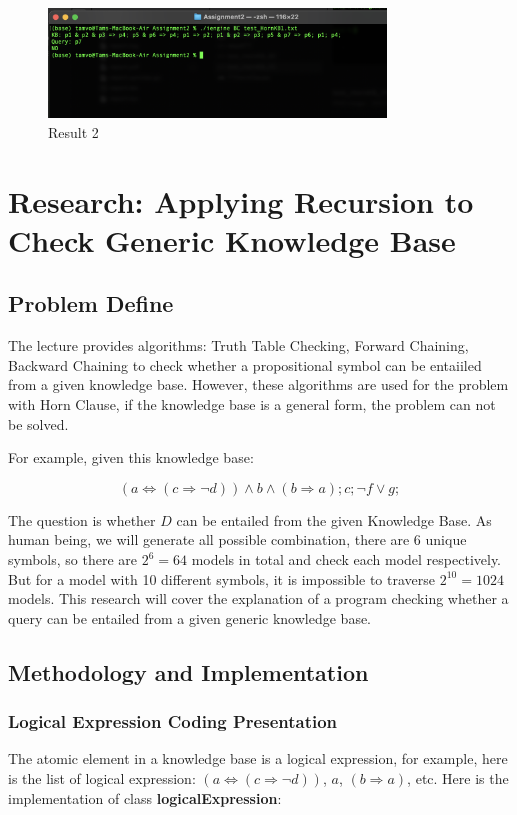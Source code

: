 \documentclass{assignment}
\begin{document}
\begin{figure}[h]
    \centering
    \includegraphics[width=0.8\textwidth]{./assets/test_HornKB1_BC.png}
    \caption{Result 2}
    \label{fig:fig10}
\end{figure}

\section{Research: Applying Recursion to Check Generic Knowledge Base}
\subsection{Problem Define}
The lecture provides algorithms: Truth Table Checking, Forward Chaining, Backward Chaining to check whether a propositional symbol can be entaiiled from a given knowledge base. However, these algorithms are used for the problem with Horn Clause, if the knowledge base is a general form, the problem can not be solved.

For example, given this knowledge base:

\[
(a \iff (c \Rightarrow \neg d)) \land b \land (b \Rightarrow a); c; \neg f \lor g;
\]

The question is whether $D$ can be entailed from the given Knowledge Base. As human being, we will generate all possible combination, there are 6 unique symbols, so there are $2^{6}=64$ models in total and check each model respectively. But for a model with 10 different symbols, it is impossible to traverse $2^10 = 1024$ models. This research will cover the explanation of a program checking whether a query can be entailed from a given generic knowledge base.

\subsection{Methodology and Implementation}

\subsubsection{Logical Expression Coding Presentation}
The atomic element in a knowledge base is a logical expression, for example, here is the list of logical expression: $(a \iff (c \Rightarrow \neg d))$, $a$, $(b \Rightarrow a)$, etc. Here is the implementation of class \textbf{logicalExpression}:
\end{document}

